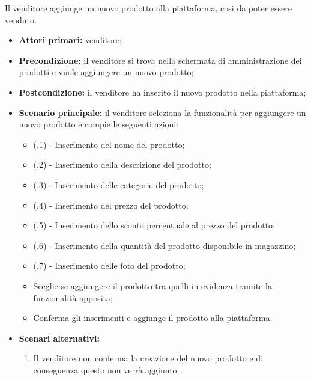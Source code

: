 Il venditore aggiunge un nuovo prodotto alla piattaforma, così da poter essere venduto.
\begin{itemize}
    \item \textbf{Attori primari:} venditore;
    \item \textbf{Precondizione:} il venditore si trova nella schermata di amministrazione dei prodotti e vuole aggiungere un nuovo prodotto;
    \item \textbf{Postcondizione:} il venditore ha inserito il nuovo prodotto nella piattaforma;
    \item \textbf{Scenario principale:} il venditore seleziona la funzionalità per aggiungere un nuovo prodotto e compie le seguenti azioni:
    \begin{itemize}
        \item (\actualUC.1) - Inserimento del nome del prodotto;
        \item (\actualUC.2) - Inserimento della descrizione del prodotto;
        \item (\actualUC.3) - Inserimento delle categorie del prodotto;
        \item (\actualUC.4) - Inserimento del prezzo del prodotto;
        \item (\actualUC.5) - Inserimento dello sconto percentuale al prezzo del prodotto;
        \item (\actualUC.6) - Inserimento della quantità del prodotto disponibile in magazzino;
        \item (\actualUC.7) - Inserimento delle foto del prodotto;
        \item Sceglie se aggiungere il prodotto tra quelli in evidenza tramite la funzionalità apposita;
        \item Conferma gli inserimenti e aggiunge il prodotto alla piattaforma.
    \end{itemize}
    \item \textbf{Scenari alternativi:}
	\begin{enumerate}[label=\lett]
		\item Il venditore non conferma la creazione del nuovo prodotto e di conseguenza questo non verrà aggiunto.
	\end{enumerate}
\end{itemize}

\resetSubUC

